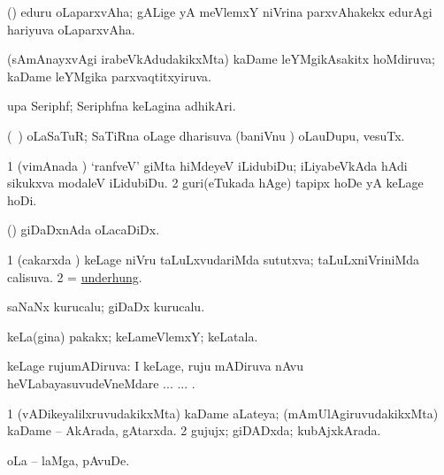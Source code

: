 \bentry
{} 
\gl{\nA}
\expl{}
\bmng
 (\nw) eduru oLaparxvAha; gALige yA meVlemxY niVrina parxvAhakekx edurAgi hariyuva oLaparxvAha. 
\emng
\eentry

\bentry
{} 
\gl{\gu}
\expl{}
\bmng
 (sAmAnayxvAgi irabeVkAdudakikxMta) kaDame leYMgikAsakitx hoMdiruva; kaDame leYMgika parxvaqtitxyiruva. 
\emng
\eentry

\bentry
{} 
\gl{\nA}
\expl{}
\bmng
 upa Seriphf; Seriphfna keLagina adhikAri. 
\emng
\eentry

\bentry
{} 
\gl{\gu}
\expl{}
\bmng
 (\kanmu\ \ame) oLaSaTuR; SaTiRna oLage dharisuva (baniVnu \mo) oLauDupu, vesuTx. 
\emng
\eentry

\bentry
{} 
\gl{\sakirx}
\expl{}
\bmng
\bnum
\num{1} (vimAnada \vi) `ranfveV' giMta hiMdeyeV iLidubiDu; iLiyabeVkAda hAdi sikukxva modaleV iLidubiDu. 
\num{2} guri(eTukada hAge) tapipx hoDe yA keLage hoDi. 
\enum
\emng
\eentry


\bentry
{} 
\gl{\nA}
\expl{}
\bmng
(\ame) giDaDxnAda oLacaDiDx. 
\emng
\eentry

\bentry
{} 	
\gl{\gu}
\expl{}
\bmng
\bnum
\num{1} (cakarxda \vi) keLage niVru taLuLxvudariMda sututxva; taLuLxniVriniMda calisuva. 
\num{2} = \hyperlink{underhung}{underhung}. 
\enum
\emng
\eentry

\bentry
{} 
\gl{\nA}
\expl{}
\bmng
 saNaNx kurucalu; giDaDx kurucalu. 
\emng
\eentry

\bentry
{} 
\gl{\nA}
\expl{}
\bmng
 keLa(gina) pakakx; keLameVlemxY; keLatala. 
\emng
\eentry

\bentry
{} 
\gl{\gu}
\expl{}
\bmng
 keLage rujumADiruva:  I keLage, ruju mADiruva nAvu heVLabayasuvudeVneMdare ... ... . 
\emng
\eentry

\bentry
{} 
\gl{\gu}
\expl{}
\bmng
\bnum
\num{1} (vADikeyalilxruvudakikxMta) kaDame aLateya; (mAmUlAgiruvudakikxMta) kaDame -- AkArada, gAtarxda. 
\num{2} gujujx; giDADxda; kubAjxkArada. 
\enum
\emng
\eentry

\bentry
{} 
\gl{\nA}
\expl{}
\bmng
 oLa -- laMga, pAvuDe. 
\emng
\eentry

